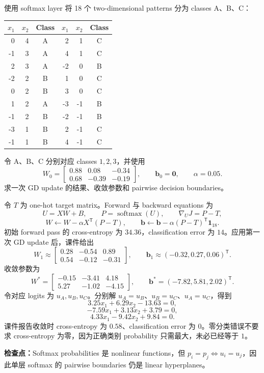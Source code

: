 使用 softmax layer 将 18 个 two-dimensional patterns 分为 classes A、B、C：
\begin{center}
\small
\begin{tabular}{@{}rrc@{\qquad}rrc@{}}
  \toprule
  $x_1$&$x_2$&Class & $x_1$&$x_2$&Class \\
  \midrule
   0& 4&A &  2& 1&C\\
  -1& 3&A &  4& 1&C\\
   2& 3&A & -2& 0&B\\
  -2& 2&B &  1& 0&C\\
   0& 2&B &  3& 0&C\\
   1& 2&A & -3&-1&B\\
  -1& 2&B & -2&-1&B\\
  -3& 1&B &  2&-1&C\\
  -1& 1&B &  4&-1&C\\
  \bottomrule
\end{tabular}
\end{center}
令 A、B、C 分别对应 classes $1,2,3$，并使用
\[
  W_0=
  \begin{bmatrix}
    0.88&0.08&-0.34\\
    0.68&-0.39&-0.19
  \end{bmatrix},
  \qquad \bm b_0=\bm0,
  \qquad \alpha=0.05.
\]
求一次 GD update 的结果、收敛参数和 pairwise decision boundaries。

\begin{checkedsolution}
令 $T$ 为 one-hot target matrix。Forward 与 backward equations 为
\[
  U=XW+B,
  \qquad P=\operatorname{softmax}(U),
  \qquad \nabla_UJ=P-T,
\]
\[
  W\leftarrow W-\alpha X^{\mathsf T}(P-T),
  \qquad
  \bm b\leftarrow\bm b-\alpha(P-T)^{\mathsf T}\bm1_{18}.
\]
初始 forward pass 的 cross-entropy 为 $34.36$，classification error 为 $14$。应用第一次 GD update 后，课件给出
\[
  \boxed{W_1\approx
  \begin{bmatrix}
    0.28&-0.54&0.89\\
    0.54&-0.12&-0.31
  \end{bmatrix}},
  \qquad
  \boxed{\bm b_1\approx(-0.32,0.27,0.06)^{\mathsf T}}.
\]
收敛参数为
\[
  W^*=\begin{bmatrix}
    -0.15&-3.41&4.18\\
    5.27&-1.02&-4.15
  \end{bmatrix},
  \qquad
  \bm b^*=(-7.82,5.81,2.02)^{\mathsf T}.
\]
令对应 logits 为 $u_A,u_B,u_C$。分别解 $u_A=u_B$、$u_B=u_C$、$u_A=u_C$，得到
\[
  \boxed{3.25x_1+6.29x_2-13.63=0},
\]
\[
  \boxed{-7.59x_1+3.13x_2+3.79=0},
\]
\[
  \boxed{4.33x_1-9.42x_2+9.84=0}.
\]
课件报告收敛时 cross-entropy 为 $0.58$、classification error 为 $0$。零分类错误不要求 cross-entropy 为零，因为正确类别 probability 只需最大，未必已经等于 $1$。
\end{checkedsolution}

\textbf{检查点：}Softmax probabilities 是 nonlinear functions，但 $p_i=p_j\iff u_i=u_j$，因此单层 softmax 的 pairwise boundaries 仍是 linear hyperplanes。
